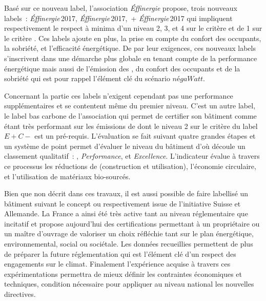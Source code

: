 Basé sur ce nouveau label, l’association \textit{Éffinergie} propose, trois nouveaux
labels~:  \textit{Éffinergie}\,2017,  \textit{Éffinergie}\,2017,
\,+ \textit{Éffinergie}\,2017 qui impliquent respectivement le respect à
minima d’un niveau 2, 3, et 4 sur le critère  et de 1 sur le critère . Ces
labels ajoute en plus, la prise en compte du confort des occupants, la sobriété, et
l’efficacité énergétique. De par leur exigences, ces nouveaux labels s’inscrivent dans une
démarche plus globale en tenant compte de la performance énergétique mais aussi de
l’émission des , du confort des occupants et de la sobriété qui est pour rappel
l’élément clé du scénario $négaWatt$.

Concernant la partie  ces labels n’exigent cependant pas une performance
supplémentaires et se contentent même du premier niveau. C’est un autre label, le label
bas carbone de l’association
 qui permet de
certifier son bâtiment comme étant très performant sur les émissions de  dont le
niveau 2 sur le critère  du label $E+C-$ est un pré-requis. L’évaluation se fait
suivant quatre grandes étapes et un système de point permet d’évaluer le niveau du
bâtiment d’où découle un classement qualitatif~: , 
\textit{Performance}, et  \textit{Excellence}. L’indicateur évalue à travers ce
processus les réductions de  (construction et utilisation), l’économie
circulaire, et l’utilisation de matériaux bio-sourcés.

Bien que non décrit dans ces travaux, il est aussi possible de faire labellisé un bâtiment
suivant le concept  ou
 respectivement issue de
l’initiative Suisse et Allemande. La France a ainsi été très active tant au niveau
réglementaire que incitatif et propose aujourd’hui des certifications permettant à un
propriétaire ou un maître d’ouvrage de valoriser un choix réfléchie tant sur le plan
énergétique, environnemental, social ou sociétale. Les données recueillies permettent de
plus de préparer la future réglementation qui est l’élément clé d’un respect des
engagements sur le climat. Finalement l’expérience acquise à travers ces expérimentations
permettra de mieux définir les contraintes économiques et techniques, condition nécessaire
pour appliquer au niveau national les nouvelles directives.



